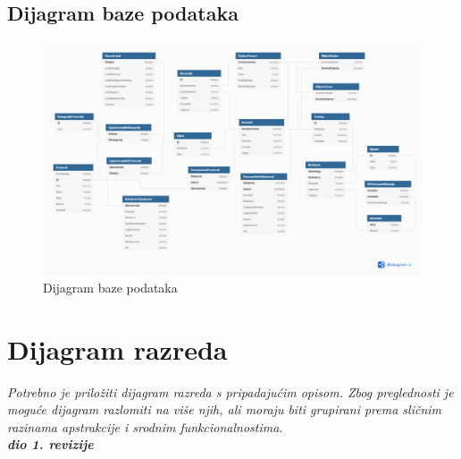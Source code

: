 			\subsection{Dijagram baze podataka}
				\begin{figure}[H]
					\includegraphics[width=\textwidth,height=\textwidth,keepaspectratio]{slike/dijagramBaze.png}
					\centering
					\caption{Dijagram baze podataka}
					\label{fig:promjene}
				\end{figure}
			
			\eject
			
			
		\section{Dijagram razreda}
		
			\textit{Potrebno je priložiti dijagram razreda s pripadajućim opisom. Zbog preglednosti je moguće dijagram razlomiti na više njih, ali moraju biti grupirani prema sličnim razinama apstrakcije i srodnim funkcionalnostima.}\\
			
			\textbf{\textit{dio 1. revizije}}\\
			

